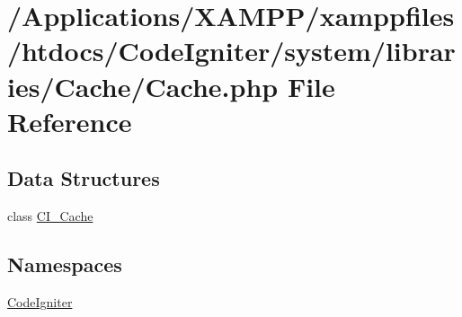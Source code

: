 \hypertarget{_cache_8php}{}\section{/\+Applications/\+X\+A\+M\+P\+P/xamppfiles/htdocs/\+Code\+Igniter/system/libraries/\+Cache/\+Cache.php File Reference}
\label{_cache_8php}
\subsection*{Data Structures}
\begin{DoxyCompactItemize}
\item 
class \mbox{\hyperlink{class_c_i___cache}{C\+I\+\_\+\+Cache}}
\end{DoxyCompactItemize}
\subsection*{Namespaces}
\begin{DoxyCompactItemize}
\item 
 \mbox{\hyperlink{namespace_code_igniter}{Code\+Igniter}}
\end{DoxyCompactItemize}
